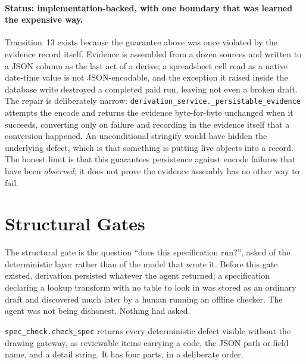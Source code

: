 \paragraph{Status: implementation-backed, with one boundary that was learned the expensive
way.}
Transition~13 exists because the guarantee above was once violated by the evidence record
itself. Evidence is assembled from a dozen sources and written to a JSON column as the last act
of a derive; a spreadsheet cell read as a native date-time value is not JSON-encodable, and the
exception it raised inside the database write destroyed a completed paid run, leaving not even a
broken draft. The repair is deliberately narrow:
\texttt{derivation\_service.\_persistable\_evidence} attempts the encode and returns the evidence
byte-for-byte unchanged when it succeeds, converting only on failure and recording in the
evidence itself that a conversion happened. An unconditional stringify would have hidden the
underlying defect, which is that something is putting live objects into a record. The honest
limit is that this guarantees persistence against encode failures that have been \emph{observed};
it does not prove the evidence assembly has no other way to fail.

\section{Structural Gates}
\label{sec:der:gates}

The structural gate is the question ``does this specification run?'', asked of the deterministic
layer rather than of the model that wrote it. Before this gate existed, derivation persisted
whatever the agent returned; a specification declaring a lookup transform with no table to look
in was stored as an ordinary draft and discovered much later by a human running an offline
checker. The agent was not being dishonest. Nothing had asked.

\texttt{spec\_check.check\_spec} returns every deterministic defect visible without the drawing
gateway, as reviewable items carrying a code, the JSON path or field name, and a detail string.
It has four parts, in a deliberate order.

